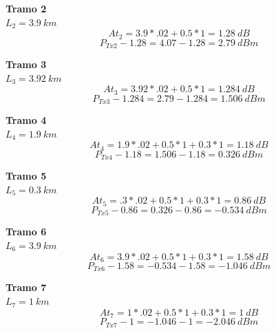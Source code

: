 \documentclass[12pt,letterpaper]{article}
\begin{document}
\textbf{Tramo 2} \\
$L_2=3.9 \ km$
\\
\begin{equation}
    At_2=3.9*.02+0.5*1=1.28 \ dB
\end{equation}
\begin{equation}
    P_{Tx2}-1.28=4.07-1.28=2.79 \ dBm
\end{equation}

\textbf{Tramo 3} \\
$L_3=3.92 \ km$
\\ 
\begin{equation}
    At_3=3.92*.02+0.5*1=1.284 \ dB
\end{equation}
\begin{equation}
    P_{Tx3}-1.284=2.79-1.284=1.506 \ dBm
\end{equation}

\textbf{Tramo 4} \\
$L_4=1.9 \ km$
\\ 
\begin{equation}
    At_4=1.9*.02+0.5*1+0.3*1=1.18 \ dB
\end{equation}
\begin{equation}
    P_{Tx4}-1.18=1.506-1.18=0.326 \ dBm
\end{equation}

\textbf{Tramo 5} \\
$L_5=0.3 \ km$
\\
\begin{equation}
    At_5=.3*.02+0.5*1+0.3*1=0.86 \ dB
\end{equation}
\begin{equation}
    P_{Tx5}-0.86=0.326-0.86=-0.534 \ dBm
\end{equation}

\textbf{Tramo 6} \\
$L_6=3.9 \ km$
\\
\begin{equation}
    At_6=3.9*.02+0.5*1+0.3*1=1.58 \ dB
\end{equation}
\begin{equation}
    P_{Tx6}-1.58=-0.534-1.58=-1.046 \ dBm
\end{equation}

\textbf{Tramo 7} \\
$L_7=1 \ km$
\\ 
\begin{equation}
    At_7=1*.02+0.5*1+0.3*1=1 \ dB
\end{equation}
\begin{equation}
    P_{Tx7}-1=-1.046-1=-2.046 \ dBm
\end{equation}
\end{document}
